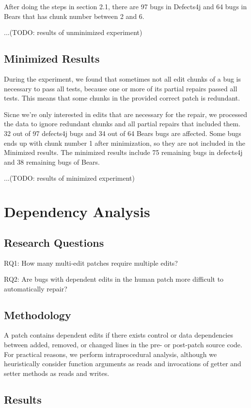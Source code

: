 \documentclass[sigconf, timestamp-false, anonymous=true]{acmart}
\begin{document}
After doing the steps in section 2.1, there are 97 bugs in Defects4j and 64 bugs in Bears that has chunk number between 2 and 6. 

...(TODO: results of unminimized experiment)

\subsection{Minimized Results}

During the experiment, we found that sometimes not all edit chunks of a bug is necessary to pass all tests, because one or more of its partial repairs passed all tests. This means that some chunks in the provided correct patch is redundant. 

Sicne we're only interested in edits that are necessary for the repair, we processed the data to ignore redundant chunks and all partial repairs that included them. 32 out of 97 defects4j bugs and 34 out of 64 Bears bugs are affected. Some bugs ends up with chunk number 1 after minimization, so they are not included in the Minimized results. The minimized results include 75 remaining bugs in defects4j and 38 remaining bugs of Bears.

...(TODO: results of minimized experiment)

\section{Dependency Analysis}
\subsection{Research Questions}
RQ1: How many multi-edit patches require multiple edits?

RQ2: Are bugs with dependent edits in the human patch more difficult to automatically repair?

\subsection{Methodology}
A patch contains dependent edits if there exists control or data dependencies 
between added, removed, or changed lines in the pre- or post-patch
source code. For practical reasons, we perform intraprocedural analysis, 
although we heuristically consider function arguments as reads 
and invocations of getter and setter methods as reads and writes.

\subsection{Results}
\end{document}
